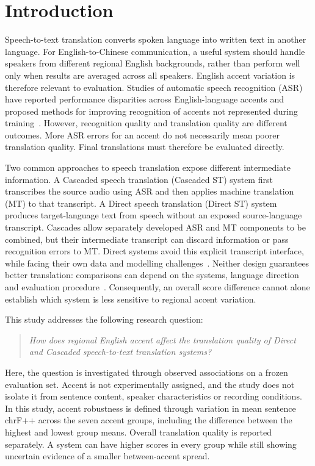 \section{Introduction}
\label{sec:introduction}

Speech-to-text translation converts spoken language into written text in another
language. For English-to-Chinese communication, a useful system should handle
speakers from different regional English backgrounds, rather than perform well
only when results are averaged across all speakers. English accent variation is
therefore relevant to evaluation. Studies of automatic speech recognition (ASR)
have reported performance disparities across English-language accents and
proposed methods for improving recognition of accents not represented during
training~\cite{dichristofano2022global,prabhu2023accentcodebooks}. However,
recognition quality and translation quality are different outcomes. More ASR
errors for an accent do not necessarily mean poorer translation quality.
Final translations must therefore be evaluated directly.

Two common approaches to speech translation expose different intermediate
information. A Cascaded speech translation (Cascaded ST) system first transcribes
the source audio using ASR and then applies machine translation (MT) to that
transcript. A Direct speech translation (Direct ST) system produces
target-language text from speech without an exposed source-language transcript.
Cascades allow separately developed ASR and MT components to be combined, but
their intermediate transcript can discard information or pass recognition
errors to MT. Direct systems avoid this explicit transcript interface, while
facing their own data and modelling challenges~\cite{sperber2020endtoend}.
Neither design guarantees better translation: comparisons can depend on the
systems, language direction and evaluation procedure~\cite{bentivogli2021cascade}.
Consequently, an overall score difference cannot alone establish which system
is less sensitive to regional accent variation.

This study addresses the following research question:
\begin{quote}
\emph{How does regional English accent affect the translation quality of
Direct and Cascaded speech-to-text translation systems?}
\end{quote}
Here, the question is investigated through observed associations on a frozen
evaluation set. Accent is not experimentally assigned, and the study does not
isolate it from sentence content, speaker characteristics or recording
conditions. In this study, accent robustness is defined through variation in mean sentence
chrF++ across the seven accent groups, including the difference between the
highest and lowest group means. Overall translation quality is reported
separately. A system can have higher scores in every group while still showing
uncertain evidence of a smaller between-accent spread.

